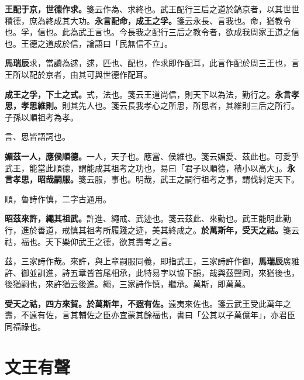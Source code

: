 \textbf{王配于京，世德作求。}{\footnotesize 箋云作為、求終也。武王配行三后之道於鎬京者，以其世世積德，庶為終成其大功。}\textbf{永言配命，成王之孚。}{\footnotesize 箋云永長、言我也。命，猶教令也。孚，信也。此為武王言也。今長我之配行三后之教令者，欲成我周家王道之信也。王德之道成於信，論語曰「民無信不立」。}

\begin{quoting}\textbf{馬瑞辰}求，當讀為逑，逑，匹也、配也，作求即作配耳，此言作配於周三王也，言王所以配於京者，由其可與世德作配耳。\end{quoting}

\textbf{成王之孚，下土之式。}{\footnotesize 式，法也。箋云王道尚信，則天下以為法，勤行之。}\textbf{永言孝思，孝思維則。}{\footnotesize 則其先人也。箋云長我孝心之所思，所思者，其維則三后之所行。子孫以順祖考為孝。}

\begin{quoting}言、思皆語詞也。\end{quoting}

\textbf{媚茲一人，應侯順德。}{\footnotesize 一人，天子也。應當、侯維也。箋云媚愛、茲此也。可愛乎武王，能當此順德，謂能成其祖考之功也，易曰「君子以順德，積小以高大」。}\textbf{永言孝思，昭哉嗣服。}{\footnotesize 箋云服，事也。明哉，武王之嗣行祖考之事，謂伐紂定天下。}

\begin{quoting}順，魯詩作慎，二字古通用。\end{quoting}

\textbf{昭茲來許，繩其祖武。}{\footnotesize 許進、繩戒、武迹也。箋云茲此、來勤也。武王能明此勤行，進於善道，戒慎其祖考所履踐之迹，美其終成之。}\textbf{於萬斯年，受天之祜。}{\footnotesize 箋云祜，福也。天下樂仰武王之德，欲其壽考之言。}

\begin{quoting}茲，三家詩作哉。來許，與上章嗣服同義，即指武王，三家詩許作御，\textbf{馬瑞辰}廣雅許、御並訓進，詩五章皆首尾相承，此特易字以協下韻，哉與茲聲同，來猶後也，後猶嗣也，來許猶云後進。繩，三家詩作慎，繼承。萬斯，即萬萬。\end{quoting}

\textbf{受天之祜，四方來賀。於萬斯年，不遐有佐。}{\footnotesize 遠夷來佐也。箋云武王受此萬年之壽，不遠有佐，言其輔佐之臣亦宜蒙其餘福也，書曰「公其以子萬億年」，亦君臣同福祿也。}

\section{文王有聲}


